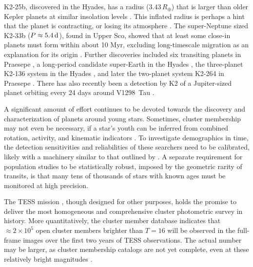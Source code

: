 \documentclass[12pt,twocolumn,tighten]{aastex62}
\begin{document}
K2-25b, discovered in the Hyades, has a radius ($3.43\,R_\oplus$) that
is larger than older Kepler planets at similar insolation levels
\citep{Mann_K2_25_2016}.  This inflated radius is perhaps a hint that
the planet is contracting, or losing its atmosphere \citep[{\it
e.g.},][]{Fortney_et_al_2007,Owen_Wu_2013,Fulton_et_al_2017}.  The
super-Neptune sized K2-33b ($P\approx 5.4\,{\rm d}$), found in Upper
Sco, showed that at least some close-in planets must form within about
10 Myr, excluding long-timescale migration as an explanation for its
origin \citep{Mann_K2_33b_2016,David_et_al_2017}.  Further discoveries
included six transiting planets in Praesepe
\citep{obermeier_k2_2016,Mann_et_al_2017}, a long-period candidate
super-Earth in the Hyades \citep{vanderburg_zeitVII_2018}, the
three-planet K2-136 system in the Hyades
\citep{ciardi_k2-136_2018,livingston_three_2018,mann_ZEITVI_2018}, and
later the two-planet system K2-264 in Praesepe
\citep{rizzuto_zeitVIII_2018,livingston_k2-264_2019}.  There has also
recently been a detection by K2 of a Jupiter-sized planet orbiting
every 24 days around V1298~Tau \citep{david_v1298_2019}.

A significant amount of effort continues to be devoted towards the
discovery and characterization of planets around young stars.
Sometimes, cluster membership may not even be necessary, if a star's
youth can be inferred from combined rotation, activity, and kinematic
indicators \citep[{e.g.}, K2-233;][]{david_k2-233_2018}.  To
investigate demographics in time, the detection sensitivities and
reliabilities of these searchers need to be calibrated, likely with a
machinery similar to that outlined by \citet{rizzuto_zeitV_2017}.  A
separate requirement for population studies to be statistically
robust, imposed by the geometric rarity of transits, is that many tens
of thousands of stars with known ages must be monitored at high
precision.

The TESS mission \citep{ricker_transiting_2015}, though designed for
other purposes, holds the promise to deliver the most homogeneous and
comprehensive cluster photometric survey in history.  More
quantitatively, the \citet{Kharchenko_et_al_2013} cluster member
database indicates that $\approx 2\times10^5$ open cluster members
brighter than $T=16$ will be observed in the full-frame images over
the first two years of TESS observations.  The actual number may be
larger, as cluster membership catalogs are not yet complete, even at
these relatively bright magnitudes \citep[{\it
e.g.},][]{roser_nine_RSG_2016,cantat-gaudin_gaia_2018,cantat-gaudin_newOCs_2019}.
\end{document}
